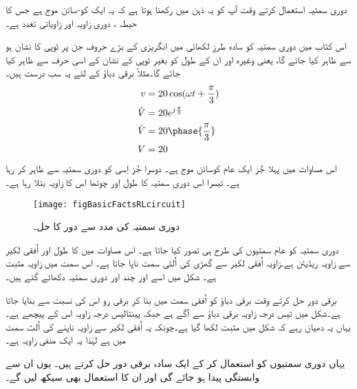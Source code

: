 	 دوری سمتیہ استعمال کرتے وقت آپ کو یہ ذہن میں رکھنا ہوتا ہے کہ یہ ایک کو-سائن موج ہے جس کا حیطہ   ، دوری زاویہ  اور زاویاتی تعدد  ہے۔

اس کتاب میں دوری سمتیہ کو سادہ طرزِ لکھائی میں انگریزی کے بڑے حروف جن پر ٹوپی کا نشان ہو سے ظاہر کیا جائے گا، یعنی   وغیرہ اور ان کے طول کو بغیر ٹوپی کے نشان کے اسی حرف سے ظاہر کیا جائے گا۔مثلاً برقی دباؤ  کے لئے یہ سب درست ہیں۔
\begin{gather}
\begin{aligned}
v&=20 \cos (\omega t +\frac{\pi}{3})\\
\hat{V}&=20 e^{j \frac{\pi}{3}}\\
\hat{V}&=20 \phase{\frac{\pi}{3}}\\
V&=20
\end{aligned}
\end{gather}
اس مساوات میں پہلا جُز ایک عام کوسائن موج ہے۔ دوسرا جُز اِسی کو دوری سمتیہ سے ظاہر کر رہا ہے۔ تیسرا اس دوری سمتیہ کا طول اور چوتھا اس کا زاویہ بتلا رہا ہے۔
\begin{figure}
\centering
\texttt{[image: figBasicFactsRLcircuit]}
\caption{دوری سمتیہ کی مدد سے  دور کا حل۔}
\label{شکل_حقائق_دوری_سمتیہ_سے_دور_حل}
\end{figure}
	دوری سمتیہ کو عام سمتیوں کی طرح ہی تصور کیا جاتا ہے۔ اس مساوات میں  کا طول  اور اُفقی لکیر سے زاویہ   ریڈیئن ہے۔زاویہ اُفقی لکیر سے گھڑی کی اُلٹی سمت ناپا جاتا ہے۔ اس سمت میں زاویہ مثبت ہے۔ شکل  میں اسے اور چند اور دوری سمتیہ دکھائے گئے ہیں۔

برقی دور حل کرتے وقت برقی دباؤ  کو اُفقی سمت میں بنا کر برقی رو   اس کی نسبت سے بنایا جاتا ہے۔شکل    میں  تیس درجہ زاویہ برقی دباؤ سے آگے  ہے جبکہ    پینتالیس درجہ زاویہ اس کے پیچھے  ہے۔یہاں یہ دھیان رہے کہ شکل میں   مثبت لکھا گیا ہے۔چونکہ یہ اُفقی لکیر سے زاویہ ناپنے کی اُلٹ سمت میں ہے لہٰذا یہ ایک منفی زاویہ ہے۔

یہاں دوری سمتیوں کو استعمال کر کے ایک سادہ برقی دور حل کرتے ہیں۔ یوں ان سے وابستگی پیدا ہو جائے گی اور ان کا استعمال بھی سیکھ لیں گے۔

